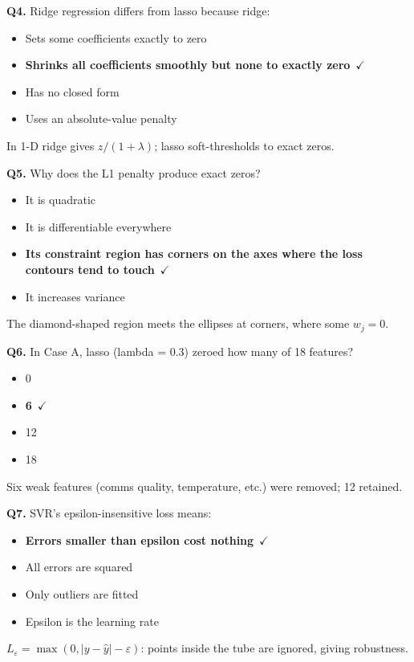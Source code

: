 \documentclass[11pt]{article}
\begin{document}
{\noindent\textbf{Q4.} Ridge regression differs from lasso because ridge:\begin{itemize}[leftmargin=2.2em,itemsep=0pt,topsep=1pt]\item[A.] Sets some coefficients exactly to zero\item[\textbf{B.}] \textbf{Shrinks all coefficients smoothly but none to exactly zero}~{\color{GrnN}$\checkmark$}\item[C.] Has no closed form\item[D.] Uses an absolute-value penalty\end{itemize} In 1-D ridge gives $z/(1+\lambda)$; lasso soft-thresholds to exact zeros.\par\medskip

\noindent\textbf{Q5.} Why does the L1 penalty produce exact zeros?\begin{itemize}[leftmargin=2.2em,itemsep=0pt,topsep=1pt]\item[A.] It is quadratic\item[B.] It is differentiable everywhere\item[\textbf{C.}] \textbf{Its constraint region has corners on the axes where the loss contours tend to touch}~{\color{GrnN}$\checkmark$}\item[D.] It increases variance\end{itemize} The diamond-shaped region meets the ellipses at corners, where some $w_j=0$.\par\medskip

\noindent\textbf{Q6.} In Case A, lasso (lambda = 0.3) zeroed how many of 18 features?\begin{itemize}[leftmargin=2.2em,itemsep=0pt,topsep=1pt]\item[A.] 0\item[\textbf{B.}] \textbf{6}~{\color{GrnN}$\checkmark$}\item[C.] 12\item[D.] 18\end{itemize} Six weak features (comms quality, temperature, etc.) were removed; 12 retained.\par\medskip

\noindent\textbf{Q7.} SVR's epsilon-insensitive loss means:\begin{itemize}[leftmargin=2.2em,itemsep=0pt,topsep=1pt]\item[\textbf{A.}] \textbf{Errors smaller than epsilon cost nothing}~{\color{GrnN}$\checkmark$}\item[B.] All errors are squared\item[C.] Only outliers are fitted\item[D.] Epsilon is the learning rate\end{itemize} $L_\varepsilon=\max(0,|y-\hat y|-\varepsilon)$: points inside the tube are ignored, giving robustness.\par\medskip

}
\end{document}
